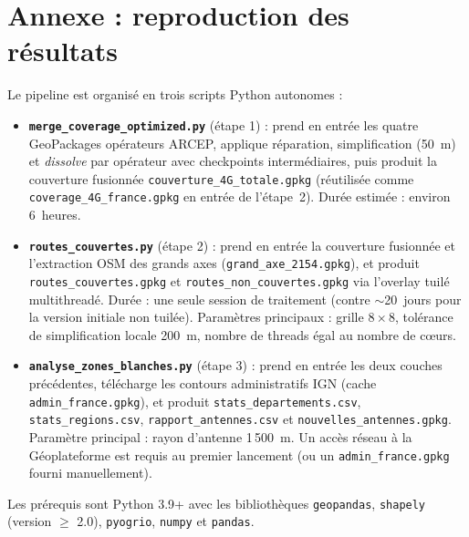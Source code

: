\documentclass[11pt,a4paper]{article}
\begin{document}
\appendix
\section*{Annexe : reproduction des résultats}

Le pipeline est organisé en trois scripts Python autonomes :
\begin{itemize}
  \item \textbf{\texttt{merge\_coverage\_optimized.py}} (étape 1) : prend en entrée les quatre GeoPackages opérateurs ARCEP, applique réparation, simplification (50~m) et \emph{dissolve} par opérateur avec checkpoints intermédiaires, puis produit la couverture fusionnée \texttt{couverture\_4G\_totale.gpkg} (réutilisée comme \texttt{coverage\_4G\_france.gpkg} en entrée de l'étape~2). Durée estimée : environ 6~heures.
  \item \textbf{\texttt{routes\_couvertes.py}} (étape 2) : prend en entrée la couverture fusionnée et l'extraction OSM des grands axes (\texttt{grand\_axe\_2154.gpkg}), et produit \texttt{routes\_couvertes.gpkg} et \texttt{routes\_non\_couvertes.gpkg} via l'overlay tuilé multithreadé. Durée : une seule session de traitement (contre $\sim$20~jours pour la version initiale non tuilée). Paramètres principaux : grille $8\times8$, tolérance de simplification locale 200~m, nombre de threads égal au nombre de cœurs.
  \item \textbf{\texttt{analyse\_zones\_blanches.py}} (étape 3) : prend en entrée les deux couches précédentes, télécharge les contours administratifs IGN (cache \texttt{admin\_france.gpkg}), et produit \texttt{stats\_departements.csv}, \texttt{stats\_regions.csv}, \texttt{rapport\_antennes.csv} et \texttt{nouvelles\_antennes.gpkg}. Paramètre principal : rayon d'antenne 1\,500~m. Un accès réseau à la Géoplateforme est requis au premier lancement (ou un \texttt{admin\_france.gpkg} fourni manuellement).
\end{itemize}

Les prérequis sont Python 3.9+ avec les bibliothèques \texttt{geopandas}, \texttt{shapely} (version $\geq$ 2.0), \texttt{pyogrio}, \texttt{numpy} et \texttt{pandas}.
\end{document}
